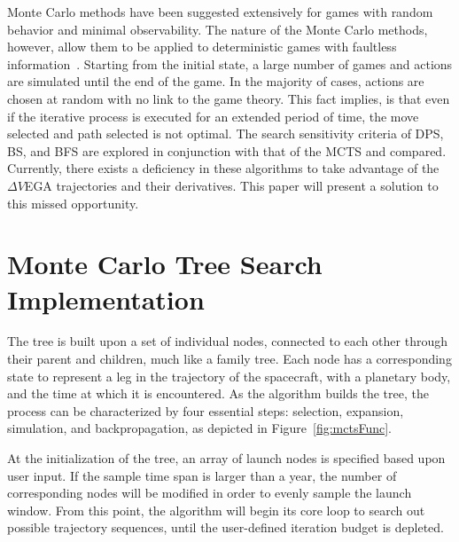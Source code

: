 \documentclass[letterpaper, preprint, paper,11pt]{AAS}	%
\newcommand*\circled[1]{\tikz[baseline=(char.base)]{
            \node[shape=circle,draw,inner sep=0.8pt] (char) {#1};}}
\begin{document}
Monte Carlo methods have been suggested extensively for games with random behavior and minimal observability. The nature of the Monte Carlo methods, however, allow them to be applied to deterministic games with faultless information~\cite{Browne2012}. Starting from the initial state, a large number of games and actions are simulated until the end of the game. In the majority of cases, actions are chosen at random with no link to the game theory. This fact implies, is that even if the iterative process is executed for an extended period of time, the move selected and path selected is not optimal. The search sensitivity criteria of DPS, BS, and BFS are explored in conjunction with that of the MCTS and compared. Currently, there exists a deficiency in these algorithms to take advantage of the $\Delta V$EGA trajectories and their derivatives. This paper will present a solution to this missed opportunity.

\section*{Monte Carlo Tree Search Implementation}

The tree is built upon a set of individual nodes, connected to each other through their parent and children, much like a family tree. Each node has a corresponding state to represent a leg in the trajectory of the spacecraft, with a planetary body, and the time at which it is encountered. As the algorithm builds the tree, the process can be characterized by four essential steps: \circled{1} selection, \circled{2} expansion, \circled{3} simulation, and \circled{4} backpropagation, as depicted in Figure~\ref*{fig:mctsFunc}.

At the initialization of the tree, an array of launch nodes is specified based upon user input. If the sample time span is larger than a year, the number of corresponding nodes will be modified in order to evenly sample the launch window. From this point, the algorithm will begin its core loop to search out possible trajectory sequences, until the user-defined iteration budget is depleted.
\end{document}
